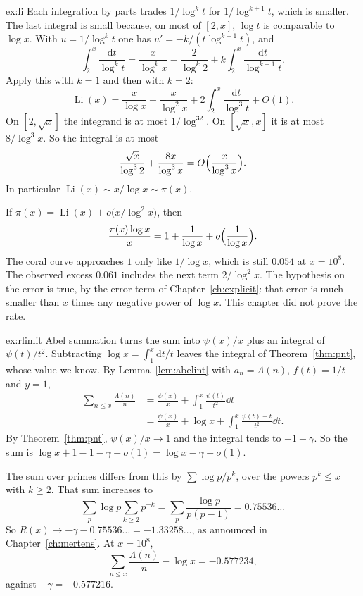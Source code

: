 \begin{solution}{ex:li}
\idea Each integration by parts trades $1/\log^kt$ for $1/\log^{k+1}t$, which is smaller. The last integral is small because, on most of $[2,x]$, $\log t$ is comparable to $\log x$.
\writeup With $u=1/\log^kt$ one has $u'=-k/(t\log^{k+1}t)$, and
\[
\int_2^x\frac{\mathrm dt}{\log^kt}=\frac x{\log^kx}-\frac2{\log^k2}+k\int_2^x\frac{\mathrm dt}{\log^{k+1}t}.
\]
Apply this with $k=1$ and then with $k=2$:
\[
\operatorname{Li}(x)=\frac x{\log x}+\frac x{\log^2x}+2\int_2^x\frac{\mathrm dt}{\log^3t}+O(1).
\]
On $[2,\sqrt x]$ the integrand is at most $1/\log^32$. On $[\sqrt x,x]$ it is at most $8/\log^3x$. So the integral is at most
\[
\frac{\sqrt x}{\log^32}+\frac{8x}{\log^3x}=O\Bigl(\frac x{\log^3x}\Bigr).
\]
In particular $\operatorname{Li}(x)\sim x/\log x\sim\pi(x)$.

If $\pi(x)=\operatorname{Li}(x)+o\bigl(x/\log^2x\bigr)$, then
\[
\frac{\pi(x)\log x}x=1+\frac1{\log x}+o\Bigl(\frac1{\log x}\Bigr).
\]
The coral curve approaches $1$ only like $1/\log x$, which is still $0.054$ at $x=10^8$. The observed excess $0.061$ includes the next term $2/\log^2x$. The hypothesis on the error is true, by the error term of Chapter~\ref{ch:explicit}: that error is much smaller than $x$ times any negative power of $\log x$. This chapter did not prove the rate.
\end{solution}

\begin{solution}{ex:rlimit}
\idea Abel summation turns the sum into $\psi(x)/x$ plus an integral of $\psi(t)/t^2$. Subtracting $\log x=\int_1^x\mathrm dt/t$ leaves the integral of Theorem~\ref{thm:pnt}, whose value we know.
\writeup By Lemma~\ref{lem:abelint} with $a_n=\Lambda(n)$, $f(t)=1/t$ and $y=1$,
\[
\begin{aligned}\sum_{n\le x}\frac{\Lambda(n)}n&=\frac{\psi(x)}x+\int_1^x\frac{\psi(t)}{t^2}\dd t\\&=\frac{\psi(x)}x+\log x+\int_1^x\frac{\psi(t)-t}{t^2}\dd t.\end{aligned}
\]
By Theorem~\ref{thm:pnt}, $\psi(x)/x\to1$ and the integral tends to $-1-\gamma$. So the sum is $\log x+1-1-\gamma+o(1)=\log x-\gamma+o(1)$.

The sum over primes differs from this by $\sum\log p/p^k$, over the powers $p^k\le x$ with $k\ge2$. That sum increases to
\[
\sum_p\log p\sum_{k\ge2}p^{-k}=\sum_p\frac{\log p}{p(p-1)}=0.75536\ldots
\]
So $R(x)\to-\gamma-0.75536\ldots=-1.33258\ldots$, as announced in Chapter~\ref{ch:mertens}. At $x=10^8$,
\[
\sum_{n\le x}\frac{\Lambda(n)}n-\log x=-0.577234,
\]
against $-\gamma=-0.577216$.
\end{solution}

